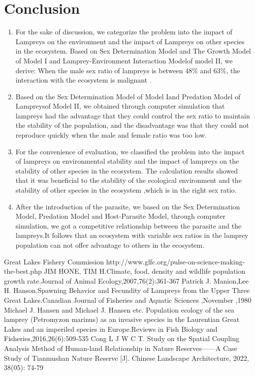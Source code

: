 \documentclass[12pt]{article}  %
\begin{document}
\section{Conclusion}
\begin{enumerate}
	\item For the sake of discussion, we categorize the problem into the impact of Lampreys on the environment and the impact of Lampreys on other species in the ecosystem. Based on Sex Determination Model and The Growth Model of Model I and Lamprey-Environment Interaction Modelof model II, we derive: When the male sex ratio of lampreys is between 48$\%$ and 63$\%$, the interaction with the ecosystem is malignant .
	\item Based on the Sex Determination Model  of Model Iand Predation Model of Lampreysof Model II, we obtained through computer simulation that lampreys had the advantage that they could control the sex ratio to maintain the stability of the population, and the disadvantage was that they could not reproduce quickly when the male and female ratio was too low.
	\item For the convenience of evaluation, we classified the problem into the impact of lampreys on environmental stability and the impact of lampreys on the stability of other species in the ecosystem.  The calculation results showed that it was beneficial to the stability of the ecological environment and the stability of other species in the ecosystem ,which is in the right sex ratio.
	\item After the introduction of the parasite, we based on the Sex Determination Model, Predation Model and Host-Parasite Model, through computer simulation, we got a competitive relationship between the parasite and the lampreys.It follows that  an ecosystem with variable sex ratios in the lamprey population can not offer advantage to others in the ecosystem.
\end{enumerate}

\clearpage   %
\begin{thebibliography}{99}
     Great Lakes Fishery Commission http://www.glfc.org/pulse-on-science-making-the-best.php
	 JIM HONE, TIM H.Climate, food, density and wildlife population growth rate.Journal of Animal Ecology,2007,76(2):361-367
	 Patrick J. Manion,Lee H. Hanson.Spawning Behavior and Fecundity of Lampreys from the Upper Three Great Lakes.Canadian Journal of Fisheries and Aquatic Sciences ,November ,1980
	 Michael J. Hansen and Michael J. Hansen etc. Population ecology of the sea lamprey (Petromyzon marinus) as an invasive species in the Laurentian Great Lakes and an imperiled species in Europe.Reviews in Fish Biology and Fisheries,2016,26(6):509-535
	 Cong L J W C T. Study on the Spatial Coupling Analysis Method of Human-land 
	Relationship in Nature Reserves——A Case Study of Tianmushan Nature Reserve [J]. 
	Chinese Landscape Architecture, 2022, 38(05): 74-79

\end{thebibliography}
%  
\clearpage
\end{document}

